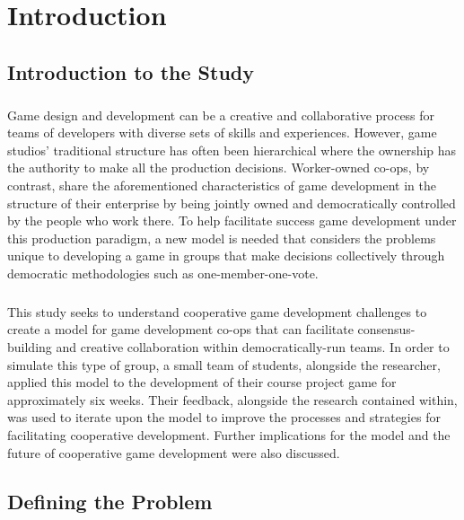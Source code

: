 \chapter{Introduction}


\section{Introduction to the Study}


\paragraph{} Game design and development can be a creative and collaborative process for teams of developers with diverse sets of skills and experiences. However, game studios' traditional structure has often been hierarchical where the ownership has the authority to make all the production decisions. Worker-owned co-ops, by contrast, share the aforementioned characteristics of game development in the structure of their enterprise by being jointly owned and democratically controlled by the people who work there. To help facilitate success game development under this production paradigm, a new model is needed that considers the problems unique to developing a game in groups that make decisions collectively through democratic methodologies such as one-member-one-vote.

\paragraph{} This study seeks to understand cooperative game development challenges to create a model for game development co-ops that can facilitate consensus-building and creative collaboration within democratically-run teams. In order to simulate this type of group, a small team of students, alongside the researcher, applied this model to the development of their course project game for approximately six weeks. Their feedback, alongside the research contained within, was used to iterate upon the model to improve the processes and strategies for facilitating cooperative development. Further implications for the model and the future of cooperative game development were also discussed. 

\section{Defining the Problem}

